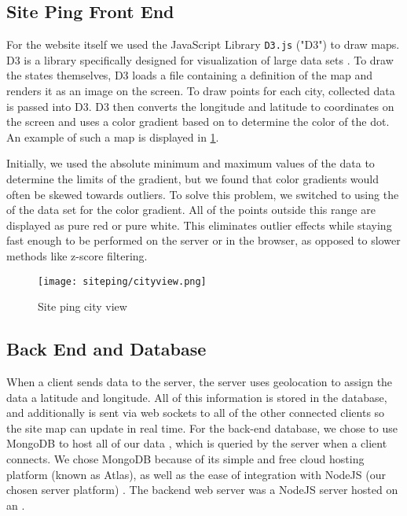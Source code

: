 \subsection{Site Ping Front End}

For the website itself we used the JavaScript Library \texttt{D3.js} ("D3") to draw maps. D3 is a library specifically designed for visualization of large data sets \cite{Bostock2011a}. To draw the states themselves, D3 loads a \json file containing a definition of the map and renders it as an \svg image on the screen. To draw points for each city, collected data is passed into D3. D3 then converts the longitude and latitude to coordinates on the screen and uses a color gradient based on \rtt to determine the color of the dot. An example of such a map is displayed in \cref{fig:siteping_city}.

Initially, we used the absolute minimum and maximum values of the data to determine the limits of the gradient, but we found that color gradients would often be skewed towards outliers. To solve this problem, we switched to using the \iqr of the data set for the color gradient. All of the points outside this range are displayed as pure red or pure white. This eliminates outlier effects while staying fast enough to be performed on the server or in the browser, as opposed to slower methods like z-score filtering.

\begin{figure}[htb]
    \centering
    \texttt{[image: siteping/cityview.png]}
    \caption{Site ping city view}
    \label{fig:siteping_city}
\end{figure}

\subsection{Back End and Database}

When a client sends data to the server, the server uses  geolocation to assign the data a latitude and longitude. All of this information is stored in the database, and additionally is sent via web sockets to all of the other connected clients so the site map can update in real time. For the back-end database, we chose to use MongoDB to host all of our data \cite{MongoDB2019a}, which is queried by the server when a client connects. We chose MongoDB because of its simple and free cloud hosting platform (known as Atlas), as well as the ease of integration with NodeJS (our chosen server platform) \cite{OpenJSFoundation2019a}. The backend web server was a NodeJS server hosted on an \aws \ecc.

